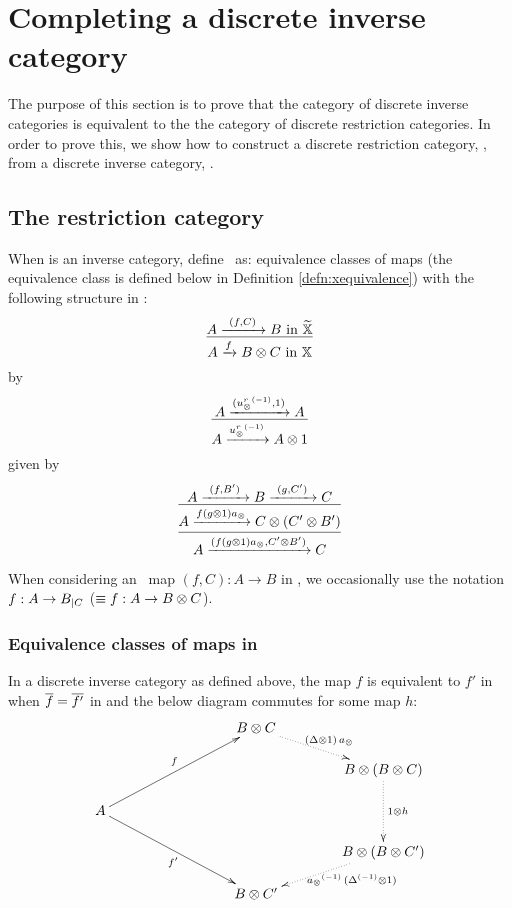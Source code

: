 
\section{Completing a discrete inverse category} %
\label{sec:completing_a_discrete_inverse_category}

The purpose of this section is to prove that the category of discrete inverse categories is
equivalent to the the category of discrete restriction categories. In order to prove this, we show
how to construct a discrete restriction category, \Xt, from a discrete inverse category, \X.


\subsection{The restriction category \hypXt} %
\label{sub:the_restriction_category_hypxt}

\begin{definition}\label{def:xt}

  When \X is an inverse category, define \Xt\ as: 
  {
    equivalence classes of maps (the equivalence class is defined below in Definition 
    \vref{defn:xequivalence}) with the following structure in \X: %
    \[
      \infer{A\xrightarrow{f} B\*C \text{ in }\X}{A \xrightarrow{\ (f,C)\ } B \text{ in } \Xt}
      \]
  }
  {%
    by
    \[
      \infer{A\xrightarrow{\inv{u_{\*}^r}}A\* 1}
            {A \xrightarrow{(\inv{u_{\*}^r}, 1)} A}
    \]
  }
  {%
    given by
    \[
      \infer{
        \infer{A\xrightarrow{(f (g\*1) a_{\*},C' \* B')} C}
              {A\xrightarrow{f (g\*1) a_{\*}} C \* (C' \* B')}
            }
            {A \xrightarrow{\ (f,B')\ } B \xrightarrow{\ (g,C')\ } C}
    \]
  }

\end{definition}

When considering an \Xt\ map $(f,C):A\to B$ in \X, we occasionally use the notation $f:A\to
{B}_{|{C}}$ ($\equiv f:A\to B\otimes C$).

\subsubsection{Equivalence classes of maps in \hypX} %
\label{ssub:equivalence_classes_of_maps_in_hypx}


\begin{definition}\label{defn:xequivalence}
  In a discrete inverse category \X as defined above, the map $f$ is equivalent to $f'$ in \X when
  $\overline{f} = \overline{f'}$ in \X and the below diagram commutes for some map $h$:
  \[
    \xymatrix @C=40pt @R=15pt{
      & & B \* C \ar@{.>}[dr]^{(\Delta\* 1) \, a_{\*}}\\
      && & B \* (B\* C) \ar@{.>}[dd]^{1\* h} \\
      A \ar[uurr]^f \ar[ddrr]_{f'}&&&\\
      && & B \* (B \* C') \ar@{.>}[dl]^(.4){\ \inv{a_{\*}}\,(\inv{\Delta}\* 1)}\\
      && B\* C'
    }
  \]
\end{definition}

